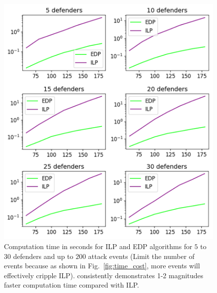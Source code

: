\begin{figure}[h!]
    \centering
    \includegraphics[width=\linewidth]{chapters/pd/fig/def_timecost-v.png}
    \caption{Computation time in seconds for ILP and EDP algorithms for $5$ to $30$ defenders and up to $200$ attack events (Limit the number of events because as shown in Fig.~\ref{fig:time_cost}, more events will effectively cripple ILP). \ours consistently demonstrates 1-2 magnitudes faster computation time compared with ILP.}
    \label{fig:def_time_cost}
\end{figure}

